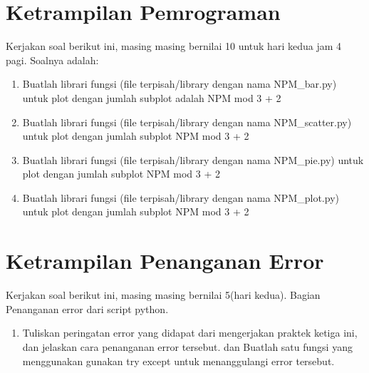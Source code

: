 \section{Ketrampilan Pemrograman}
Kerjakan soal berikut ini, masing masing bernilai 10 untuk hari kedua jam 4 pagi. Soalnya adalah:

\begin{enumerate}
\item
Buatlah librari fungsi (file terpisah/library dengan nama NPM\_bar.py) untuk plot dengan jumlah subplot adalah NPM mod 3 + 2
\item
Buatlah librari fungsi (file terpisah/library dengan nama NPM\_scatter.py) untuk plot dengan jumlah subplot NPM mod 3 + 2
\item
Buatlah librari fungsi (file terpisah/library dengan nama NPM\_pie.py) untuk plot dengan jumlah subplot NPM mod 3 + 2
\item
Buatlah librari fungsi (file terpisah/library dengan nama NPM\_plot.py) untuk plot dengan jumlah subplot NPM mod 3 + 2
\end{enumerate}




\section{Ketrampilan Penanganan Error}
Kerjakan soal berikut ini, masing masing bernilai 5(hari kedua). Bagian Penanganan error dari script python.
\begin{enumerate}
\item
Tuliskan peringatan error yang didapat dari mengerjakan praktek ketiga ini, dan jelaskan cara penanganan error tersebut.
dan Buatlah satu fungsi yang menggunakan gunakan try except untuk menanggulangi error tersebut.
\end{enumerate}



